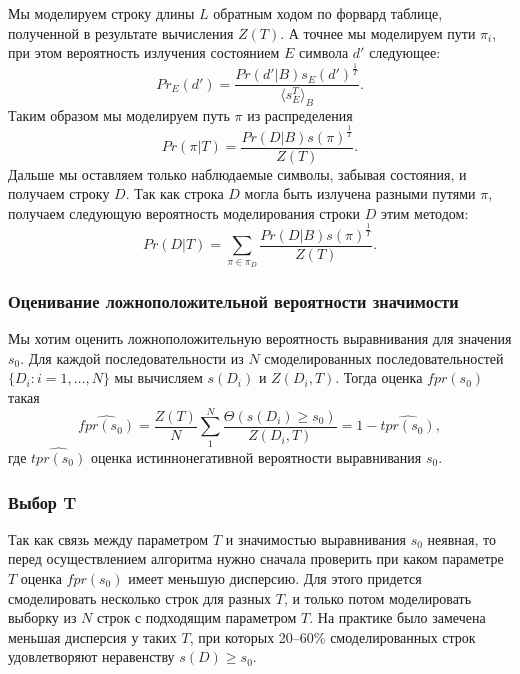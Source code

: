 \documentclass[]{article}
\begin{document}
			Мы моделируем строку длины $L$ обратным ходом по форвард таблице, полученной в результате вычисления $Z(T)$. А точнее мы моделируем пути $\pi_{i}$, при этом вероятность излучения состоянием $E$ символа $d'$ следующее:
			\begin{equation}
				Pr_{E}(d') = \frac{Pr(d'|B)s_{E}(d')^{\frac{1}{T}}} {\langle s_{E}^{T} \rangle_{B}}.
			\end{equation}			
			Таким образом мы моделируем путь $\pi$ из распределения 
			\begin{equation}
				Pr(\pi|T) = \frac{Pr(D|B)s(\pi)^{\frac{1}{T}}}{Z(T)}.
			\end{equation}
			Дальше мы оставляем только наблюдаемые символы, забывая состояния, и получаем строку $D$. Так как строка $D$ могла быть излучена разными путями $\pi$, получаем следующую вероятность моделирования строки $D$ этим методом:
			\begin{equation}				
				Pr(D|T) = \sum_{\pi \in \pi_{D}} \frac{Pr(D|B)s(\pi)^{\frac{1}{T}}}{Z(T)}.
			\end{equation}	
			
			\subsubsection{Оценивание ложноположительной вероятности значимости}			
			Мы хотим оценить ложноположительную вероятность выравнивания для значения $s_{0}$. Для каждой последовательности из $N$ смоделированных последовательностей $\{D_{i}:i=1,\dots,N\}$ мы вычисляем $s(D_{i})$ и $Z(D_{i}, T)$. Тогда оценка $fpr(s_{0})$ такая
			\begin{equation}	
				\widehat{fpr(s_{0})} = \frac{Z(T)}{N} \sum_{1}^{N} \frac{\Theta(s(D_{i}) \geq s_{0})}{Z(D_{i}, T)} = 1-\widehat{tpr(s_{0})},
			\end{equation}				
			где $\widehat{tpr(s_{0})}$ оценка истиннонегативной вероятности выравнивания $s_{0}$.
			
			\subsubsection{Выбор T}
			Так как связь между параметром $T$ и значимостью выравнивания $s_{0}$ неявная, то перед осуществлением алгоритма нужно сначала проверить при каком параметре $T$ оценка $fpr(s_{0})$ имеет меньшую дисперсию. Для этого придется смоделировать несколько строк для разных $T$, и только потом моделировать выборку из $N$ строк с подходящим параметром $T$. На практике было замечена меньшая дисперсия у таких $T$, при которых 20--60$\%$ смоделированных строк удовлетворяют неравенству $s(D) \geq s_{0}$.
			
\end{document}
